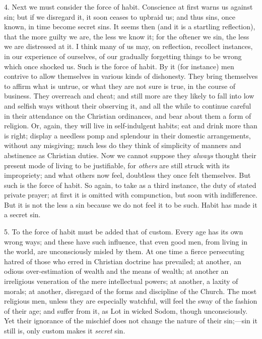 4. Next we must consider the force of habit.
Conscience at first warns us against sin; but if we
disregard it, it soon ceases to upbraid us; and thus
sins, once known, in time become secret sins. It seems
then (and it is a startling reflection), that the more
guilty we are, the less we know it; for the oftener we
sin, the less we are distressed at it. I think many of us
may, on reflection, recollect instances, in our
experience of ourselves, of our gradually forgetting
things to be wrong which once shocked us. Such is the
force of habit. By it (for instance) men contrive to
allow themselves in various kinds of dishonesty. They
bring themselves to affirm what is untrue, or what they
are not sure is true, in the course of business. They
overreach and cheat; and still more are they likely to
fall into low and selfish ways without their observing
it, and all the while to continue careful in their
attendance on the Christian ordinances, and bear about
them a form of religion. Or, again, they will live in
self-indulgent habits; eat and drink more than is right;
display a needless pomp and splendour in their domestic
arrangements, without any misgiving; much less do they
think of simplicity of manners and abstinence as
Christian duties. Now we cannot suppose they \emph{always}
thought their present mode of living to be justifiable,
for \emph{others} are still struck with its
impropriety; and what others now feel, doubtless they
once felt themselves. But such is the force of habit. So
again, to take as a third instance, the duty of stated
private prayer; at first it is omitted with compunction,
but soon with indifference. But it is not the less a sin
because we do not feel it to be such. Habit has made it a
secret sin.

5. To the force of habit must be added that of custom.
Every age has its own wrong ways; and these have such
influence, that even good men, from living in the world,
are unconsciously misled by them. At one time a fierce
persecuting hatred of those who erred in Christian
doctrine has prevailed; at another, an odious
over-estimation of wealth and the means of wealth; at
another an irreligious veneration of the mere
intellectual powers; at another, a laxity of morals; at
another, disregard of the forms and discipline of the
Church. The most religious men, unless they are
especially watchful, will feel the sway of the fashion of
their age; and suffer from it, as Lot in wicked Sodom,
though unconsciously. Yet their ignorance of the mischief
does not change the nature of their sin;—sin it
still is, only custom makes it \emph{secret} sin.

